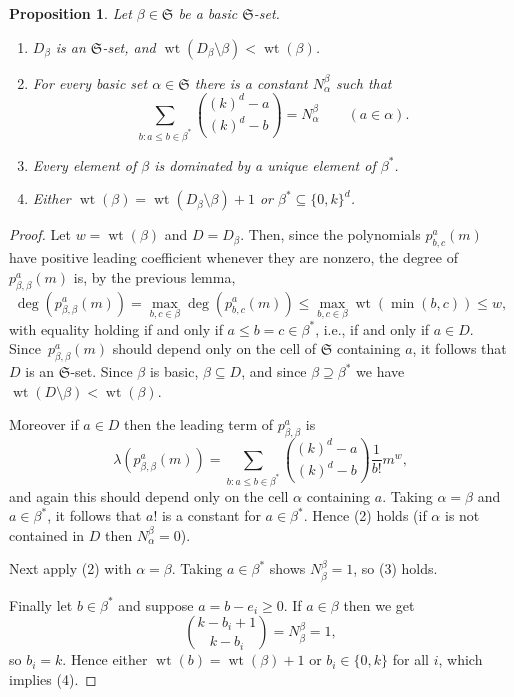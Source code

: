 \documentclass[10pt]{article}
\newtheorem{prop}[theorem]{Proposition}
\newcommand{\fS}{\mathfrak S}
\newcommand{\wt}{\operatorname{wt}}
\renewcommand{\subset}{\subseteq}
\renewcommand{\supset}{\supseteq}
\begin{document}
\begin{prop}\label{key-prop}
    Let $\beta \in \fS$ be a basic $\fS$-set.
    \begin{enumerate}
        \item $D_\beta$ is an $\fS$-set, and $\wt(D_\beta \setminus \beta) < \wt(\beta)$.
        \item For every basic set $\alpha \in \fS$ there is a constant $N^\beta_\alpha$ such that
        \[
            \sum_{b : a \leq b \in \beta^*} \binom{(k)^d - a}{(k)^d - b} = N^\beta_\alpha \qquad (a \in \alpha).
        \]
        \item Every element of $\beta$ is dominated by a unique element of $\beta^*$.
        \item Either $\wt(\beta) = \wt(D_\beta \setminus \beta) + 1$ or $\beta^* \subset \{0, k\}^d$.
    \end{enumerate}
\end{prop}
\begin{proof}
    Let $w = \wt(\beta)$ and $D = D_\beta$.
    Then, since the polynomials $p^a_{b,c}(m)$ have positive leading coefficient whenever they are nonzero,
    the degree of $p^a_{\beta,\beta}(m)$ is, by the previous lemma,
    \[
        \deg(p^a_{\beta,\beta}(m)) = \max_{b, c \in \beta} \deg(p^a_{b,c}(m)) \le \max_{b, c \in \beta} \wt(\min(b, c)) \le w,
    \]
    with equality holding if and only if $a \leq b = c \in \beta^*$, i.e., if and only if $a \in D$.
    Since~$p^a_{\beta,\beta}(m)$ should depend only on the cell of $\fS$ containing $a$,
    it follows that $D$ is an $\fS$-set.
    Since $\beta$ is basic, $\beta \subset D$, and since $\beta \supset \beta^*$ we have $\wt(D \setminus \beta) < \wt(\beta)$.
    
    Moreover if $a \in D$ then the leading term of $p^a_{\beta,\beta}$ is
    \[
        \lambda(p^a_{\beta,\beta}(m)) = \sum_{b : a \leq b \in \beta^*} \binom{(k)^d - a}{(k)^d - b} \frac1{b!} m^w,
    \]
    and again this should depend only on the cell $\alpha$ containing $a$.
    {Taking $\alpha = \beta$ and $a\in \beta^*$, it follows that $a!$ is a constant for $a \in \beta^*$.}
    Hence (2) holds (if $\alpha$ is not contained in $D$ then $N^\beta_\alpha = 0$).
    
    Next apply (2) with $\alpha = \beta$.
    Taking $a \in \beta^*$ shows $N^\beta_\beta = 1$, so (3) holds.
    
    Finally let $b \in \beta^*$ and suppose $a = b - e_i \ge 0$.
    If $a \in \beta$ then we get
    \[
        \binom{k-b_i+1}{k-b_i} = N^\beta_\beta = 1,
    \]
    so $b_i = k$.
    Hence either $\wt(b) = \wt(\beta)+1$ or $b_i \in \{0, k\}$ for all $i$, which implies (4).
\end{proof}
\end{document}
